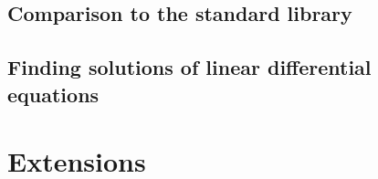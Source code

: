 \documentclass[submission,copyright]{eptcs}
\begin{document}

\subsection{Comparison to the standard library}


\subsection{Finding solutions of linear differential equations}


\section{Extensions}

\end{document}
